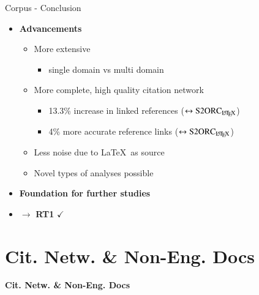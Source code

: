 \documentclass[en,16:9,smallfoot]{sdqbeamer}
\begin{document}
   \begin{frame}{Corpus - Conclusion}
        \begin{itemize}
        \item \textbf{Advancements}
            \begin{itemize}
                \item More extensive
                \begin{itemize}
                    \item single domain vs multi domain
                \end{itemize}
                \item More complete, high quality citation network
                \begin{itemize}
                    \item 13.3\% increase in linked references {\color{contextgrey}($\leftrightarrow \text{S2ORC}_\text{\LaTeX}$)}
                    \item 4\% more accurate reference links {\color{contextgrey}($\leftrightarrow \text{S2ORC}_\text{\LaTeX}$)}
                \end{itemize}
                \item Less noise due to \LaTeX\ as source
                \item Novel types of analyses possible
            \end{itemize}
        \item \textbf{Foundation for further studies}
        \item $\rightarrow$ \textbf{RT1} $\checkmark$
        \end{itemize}
   \end{frame}


\section{Cit. Netw. \& Non-Eng. Docs}

   \begin{frame}[plain]
        \vspace{0.7cm}
        \begin{infobox-map}
        \centering
        \begin{Huge}
        \textbf{Cit. Netw. \& Non-Eng. Docs}\\
        \end{Huge}
        \end{infobox-map}
   \end{frame}
\end{document}
